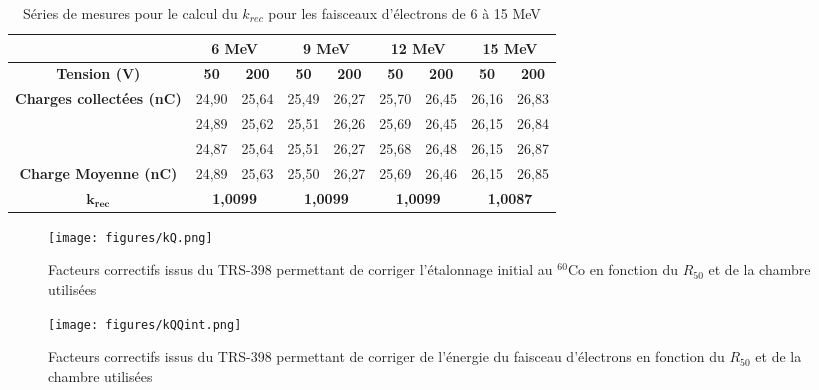 \documentclass{article}
\begin{document}
\begin{table}[h]
  \centering
  \begin{tabular}{cclclclcl}
  \cline{2-9}
  \multicolumn{1}{c|}{} & \multicolumn{2}{c|}{\textbf{6 MeV}} & \multicolumn{2}{c|}{\textbf{9 MeV}} & \multicolumn{2}{c|}{\textbf{12 MeV}} & \multicolumn{2}{c|}{\textbf{15 MeV}} \\ \hline
  \multicolumn{1}{|c|}{\textbf{Tension (V)}} & \textbf{50} & \multicolumn{1}{c|}{\textbf{200}} & \textbf{50} & \multicolumn{1}{c|}{\textbf{200}} & \textbf{50} & \multicolumn{1}{c|}{\textbf{200}} & \textbf{50} & \multicolumn{1}{c|}{\textbf{200}} \\ \hline
  \multicolumn{1}{|c|}{\multirow{3}{*}{\textbf{Charges collectées (nC)}}} & 24,90 & \multicolumn{1}{c|}{25,64} & 25,49 & \multicolumn{1}{c|}{26,27} & 25,70 & \multicolumn{1}{c|}{26,45} & 26,16 & \multicolumn{1}{c|}{26,83} \\
  \multicolumn{1}{|c|}{} & 24,89 & \multicolumn{1}{c|}{25,62} & 25,51 & \multicolumn{1}{c|}{26,26} & 25,69 & \multicolumn{1}{c|}{26,45} & 26,15 & \multicolumn{1}{c|}{26,84} \\
  \multicolumn{1}{|c|}{} & 24,87 & \multicolumn{1}{c|}{25,64} & 25,51 & \multicolumn{1}{c|}{26,27} & 25,68 & \multicolumn{1}{c|}{26,48} & 26,15 & \multicolumn{1}{c|}{26,87} \\ \hline
  \multicolumn{1}{|c|}{\textbf{Charge Moyenne (nC)}} & 24,89 & \multicolumn{1}{c|}{25,63} & 25,50 & \multicolumn{1}{c|}{26,27} & 25,69 & \multicolumn{1}{c|}{26,46} & 26,15 & \multicolumn{1}{c|}{26,85} \\ \hline
  \multicolumn{1}{|c|}{$\mathbf{k_{rec}}$} & \multicolumn{2}{c|}{\textbf{1,0099}} & \multicolumn{2}{c|}{\textbf{1,0099}} & \multicolumn{2}{c|}{\textbf{1,0099}} & \multicolumn{2}{c|}{\textbf{1,0087}} \\ \hline
  \end{tabular}
  \caption{Séries de mesures pour le calcul du $k_{rec}$ pour les faisceaux d'électrons de 6 à 15 MeV}
\end{table}

\newpage
\begin{figure}[h]
  \centering
  \texttt{[image: figures/kQ.png]}
  \caption{Facteurs correctifs issus du TRS-398 permettant de corriger l'étalonnage initial au $^{60}$Co en fonction du $R_{50}$ et de la chambre utilisées}
  \label{fig_kQ_TRS}
\end{figure}

\begin{figure}[h]
  \centering
  \texttt{[image: figures/kQQint.png]}
  \caption{Facteurs correctifs issus du TRS-398 permettant de corriger de l'énergie du faisceau d'électrons en fonction du $R_{50}$ et de la chambre utilisées}
  \label{fig_kQQint_TRS}
\end{figure}
\end{document}
